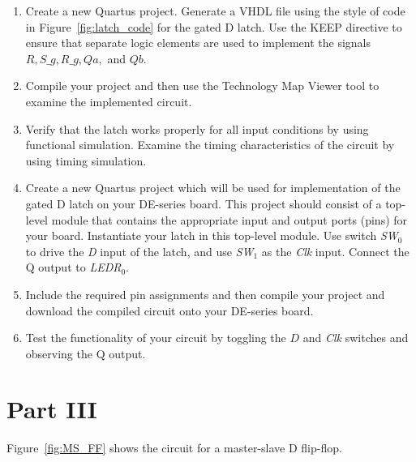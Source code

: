 \documentclass[epsfig,10pt,fullpage]{article}
\begin{document}
\begin{enumerate}
\item Create a new Quartus project. Generate a VHDL file using the style of code 
in Figure~\ref{fig:latch_code} for the gated D latch. Use the KEEP directive to ensure
that separate logic elements are used to implement the signals $R, S\_g, R\_g, Qa,$ and
$Qb$.
\item Compile your project and then use the 
Technology Map Viewer tool to examine the implemented circuit.
\item Verify that the latch works properly for all input conditions by using functional 
simulation. Examine the timing characteristics of the circuit by using timing simulation.
\item Create a new Quartus project which will be used for implementation of the gated D
latch on your DE-series board. This project should consist of a top-level module that 
contains the appropriate input and output ports (pins) for your board. Instantiate your
latch in this top-level module. Use switch {\it SW}$_0$ to drive the {\it D} input of the latch,
and use {\it SW}$_1$ as the {\it Clk} input. Connect the Q output to {\it LEDR}$_{0}$.
\item
Include the required pin assignments and then compile your project and download the 
compiled circuit onto your DE-series board.
\item
Test the functionality of your circuit by toggling the $D$ and {\it Clk} switches and observing 
the Q output.
\end{enumerate}

\section*{Part III}
Figure~\ref{fig:MS_FF} shows the circuit for a master-slave D flip-flop.
\end{document}
